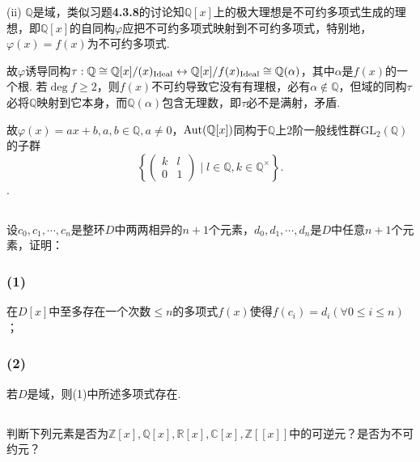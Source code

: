(ii) $\mathbb{Q}$是域，类似{\heiti 习题}\textbf{4.3.8}的讨论知$\mathbb{Q}[x]$上的极大理想是不可约多项式生成的理想，即$\mathbb{Q}[x]$的自同构$\varphi$应把不可约多项式映射到不可约多项式，特别地，$\varphi(x)=f(x)$为不可约多项式.

故$\varphi$诱导同构$\tau: \mathbb{Q}\cong\mathbb{Q}[x]/(x)_{\operatorname{Ideal}}\leftrightarrow\mathbb{Q}[x]/f(x)_{\operatorname{Ideal}}\cong\mathbb{Q}(\alpha)$，其中$\alpha$是$f(x)$的一个根. 若$\deg f\geq 2$，则$f(x)$不可约导致它没有有理根，必有$\alpha\notin\mathbb{Q}$，但域的同构$\tau$必将$\mathbb{Q}$映射到它本身，而$\mathbb{Q}(\alpha)$包含无理数，即$\tau$必不是满射，矛盾.

故$\varphi(x)=ax+b, a,b\in\mathbb{Q},a\neq 0$，$\operatorname{Aut}(\mathbb{Q}[x])$同构于$\mathbb{Q}$上$2$阶一般线性群$\mathrm{GL}_2(\mathbb{Q})$的子群
$$\left\{
\begin{pmatrix}
	k & l\\
	0 & 1
\end{pmatrix}
\mid l\in\mathbb{Q}, k\in\mathbb{Q}^{\times} \right\}.$$.

\subsection{}
设$c_0,c_1,\cdots, c_n$是整环$D$中两两相异的$n+1$个元素，$d_0,d_1,\cdots,d_n$是$D$中任意$n+1$个元素，证明：

\subsubsection{(1)}
在$D[x]$中至多存在一个次数$\leq n$的多项式$f(x)$使得$f(c_i)=d_i (\forall 0\leq i \leq n)$；


\subsubsection{(2)}
若$D$是域，则(1)中所述多项式存在.


\subsection{}
判断下列元素是否为$\mathbb{Z}[x], \mathbb{Q}[x], \mathbb{R}[x], \mathbb{C}[x], \mathbb{Z}[[x]]$中的可逆元？是否为不可约元？

